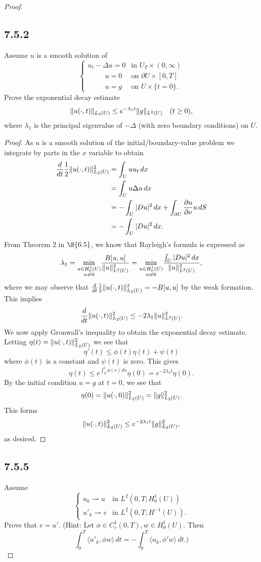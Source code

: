 \documentclass{article}
\DeclarePairedDelimiter{\norm}{\lVert}{\rVert}
\begin{document}
\begin{flushleft}
\begin{proof}
\subsection{\textbf{7.5.2}} Assume $u$ is a smooth solution of 
\[
  \begin{cases} 
      u_t-\Delta u=0 & \text{in $U_T \times (0,\infty)$} \\
      ~~\qquad u=0 & \text{on $\partial U\times[0,T]$} \\
      ~~\qquad u = g & \text{on $U\times \{t=0\}$.}
   \end{cases}
\]
Prove the exponential decay estimate
$$\norm{u(\cdot,t)}_{L_2(U)} \le e^{-\lambda_1 t}\norm{g}_{L^2(U)}\quad (t\ge 0),$$
where $\lambda_1$ is the principal eigenvalue of $-\Delta$ (with zero boundary conditions) on $U$.
\begin{proof}
As $u$ is a smooth solution of the initial/boundary-value problem we integrate by parts in the $x$ variable to obtain
\begin{align*}
\frac{d}{dt}\frac{1}{2}\norm{u(\cdot,t)}_{L_2(U)}^2 &=
\int_U u u_t\,dx\\&=
\int_U u \Delta u \,dx \\&=
-\int_U |Du|^2\,dx + \int_{\partial U}\frac{\partial u}{\partial \nu} u \,dS\\&=
-\int_U |Du|^2\,dx.
\end{align*}
From Theorem $2$ in $\S{6.5}$, we know that Rayleigh's formula is expressed as
$$\lambda_1 = \underset{\substack {u \in H_0^1 (U)\\ u\neq 0}}\min \frac{B[u,u]}{\norm{u}_{L^2(U)}^2} = 
\underset{\substack {u \in H_0^1 (U)\\ u\neq 0}}\min \frac{\int_U |Du|^2\,dx}{\norm{u}_{L^2(U)}^2},$$
where we may observe that $\frac{d}{dt}\frac{1}{2}\norm{u(\cdot,t)}_{L_2(U)}^2=-B[u,u]$ by the weak formation. This implies
$$\frac{d}{dt}\norm{u(\cdot,t)}_{L_2(U)}^2 \le -2\lambda_1\norm{u}_{L^2(U)}^2.$$
We now apply Gronwall's inequality to obtain the exponential decay estimate. Letting $\eta(t) = \norm{u(\cdot,t)}_{L_2(U)}^2$ we see that
$$\eta'(t)\le \phi(t)\eta(t)+\psi(t)$$
where $\phi(t)$ is a constant and $\psi(t)$ is zero. This gives
$$\eta(t)\le e^{\int_0^t \phi(s)\,ds}\eta(0)=e^{-2\lambda_1 t}\eta(0).$$
By the initial condition $u=g$ at $t=0$, we see that
$$\eta(0)=\norm{u(\cdot,0)}_{L_2(U)}^2=\norm{g}_{L_2(U)}^2.$$
This forms
$$\norm{u(\cdot,t)}_{L_2(U)}^2 \le e^{-2\lambda_1 t}\norm{g}_{L_2(U)}^2,$$
as desired.
\end{proof}
\subsection{\textbf{7.5.5}} Assume
\[
  \begin{cases} 
      u_k \rightharpoonup u & \text{in $L^2(0,T;H_0^1(U))$}\\
      u'_k \rightharpoonup v & \text{in $L^2(0,T;H^{-1}(U))$}.
   \end{cases}
\]
Prove that $v=u'$. (Hint: Let $\phi\in C_c^1(0,T), w\in H_0^1(U).$ Then
$$\int_0^T \langle u'_k,\phi w\rangle \,dt = - \int_0^T \langle u_k,\phi' w\rangle \,dt.)$$


\end{proof}
\end{flushleft}
\end{document}
